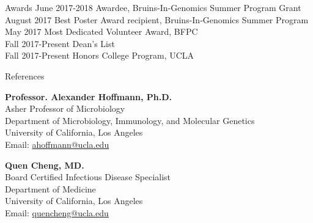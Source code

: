 \documentclass{resume} %
\begin{document}
\begin{rSection}{Awards}
June 2017-2018 \hspace{3em} Awardee, Bruins-In-Genomics Summer Program Grant\\
August 2017 \hspace{4.3em} Best Poster Award recipient, Bruins-In-Genomics Summer Program \\
May 2017 \hspace{5.5em} Most Dedicated Volunteer Award, BFPC \\
Fall 2017-Present \hspace{2.2em} Dean's List \\
Fall 2017-Present \hspace{2.2em} Honors College Program, UCLA\\
\end{rSection}





\begin{rSection}{References}
\end{rSection}


\vspace{-1em} 
\textbf{Professor. Alexander Hoffmann, Ph.D.} \\
Asher Professor of Microbiology  \\
Department of Microbiology, Immunology, and Molecular Genetics \\
University of California, Los Angeles \\
Email: \href{mailto:ahoffmann@ucla.edu}{ahoffmann@ucla.edu} 

\vspace{1em} 

\textbf{Quen Cheng, MD.} \\
Board Certified Infectious Disease Specialist \\
Department of Medicine \\
University of California, Los Angeles \\
Email: \href{mailto:quencheng@ucla.edu}{quencheng@ucla.edu} 


\end{document}
